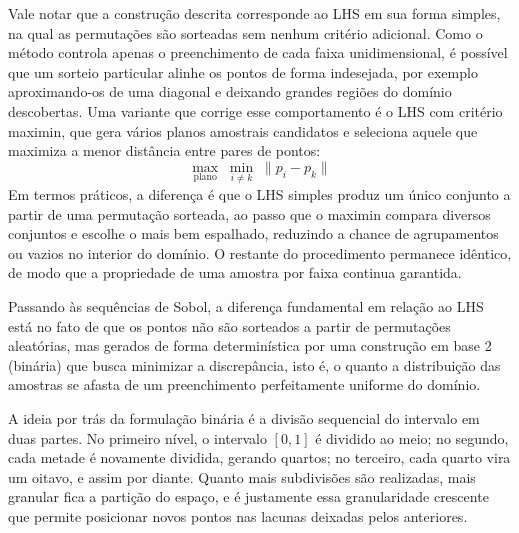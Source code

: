 \documentclass[12pt,a4paper]{article}
\begin{document}
Vale notar que a construção descrita corresponde ao LHS em sua forma simples, na qual as permutações são sorteadas sem nenhum critério adicional. Como o método controla apenas o preenchimento de cada faixa unidimensional, é possível que um sorteio particular alinhe os pontos de forma indesejada, por exemplo aproximando-os de uma diagonal e deixando grandes regiões do domínio descobertas. Uma variante que corrige esse comportamento é o LHS com critério maximin, que gera vários planos amostrais candidatos e seleciona aquele que maximiza a menor distância entre pares de pontos:
$$ \max_{\text{plano}} \; \min_{i \neq k} \; \lVert p_i - p_k \rVert $$
Em termos práticos, a diferença é que o LHS simples produz um único conjunto a partir de uma permutação sorteada, ao passo que o maximin compara diversos conjuntos e escolhe o mais bem espalhado, reduzindo a chance de agrupamentos ou vazios no interior do domínio. O restante do procedimento permanece idêntico, de modo que a propriedade de uma amostra por faixa continua garantida.

Passando às sequências de Sobol, a diferença fundamental em relação ao LHS está no fato de que os pontos não são sorteados a partir de permutações aleatórias, mas gerados de forma determinística por uma construção em base 2 (binária) que busca minimizar a discrepância, isto é, o quanto a distribuição das amostras se afasta de um preenchimento perfeitamente uniforme do domínio.

A ideia por trás da formulação binária é a divisão sequencial do intervalo em duas partes. No primeiro nível, o intervalo $[0,1]$ é dividido ao meio; no segundo, cada metade é novamente dividida, gerando quartos; no terceiro, cada quarto vira um oitavo, e assim por diante. Quanto mais subdivisões são realizadas, mais granular fica a partição do espaço, e é justamente essa granularidade crescente que permite posicionar novos pontos nas lacunas deixadas pelos anteriores.
\end{document}

